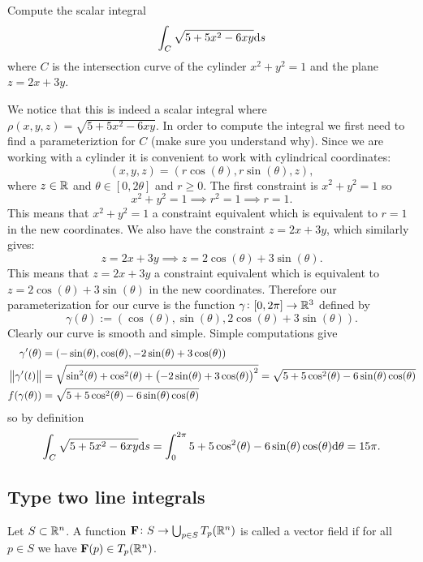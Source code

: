 \documentclass[11pt,a4paper]{article}
\begin{document}
\begin{exercise}
  Compute the scalar integral
  \[
    \int_{C} \sqrt{5 + 5x^2 - 6xy} \mathrm{d} s
  \]
  where $C$ is the intersection curve of the cylinder $x^2 + y^2 = 1$
  and the plane $z = 2x + 3y$.
\end{exercise}
\begin{solution}
  We notice that this is indeed a scalar integral where
  $\rho(x,y,z) = \sqrt{5 + 5x^2 - 6xy}$.
  In order to compute the integral we
  first need to find a parameteriztion for $C$ (make sure you understand why).
  Since we are working with a cylinder it is convenient to work with
  cylindrical coordinates:
  \[
    (x,y,z) = (r\cos(\theta),r\sin(\theta),z),
  \]
  where $z \in \mathbb{R}$ and $\theta \in [0,2\theta]$ and $r \geq 0$.
  The first constraint is $x^2 + y^2 = 1$ so
  \[
    x^2 + y^2 = 1 \implies
    r^2 = 1 \implies r = 1.
  \]
  This means that $x^2 + y^2 = 1$ a constraint equivalent
  which is equivalent to $r = 1$ in the new coordinates.
  We also have the constraint $z = 2x + 3y$, which similarly gives:
  \[
    z = 2x + 3y \implies
    z = 2\cos(\theta) + 3\sin(\theta).
  \]
  This means that $z = 2x + 3y$ a constraint equivalent
  which is equivalent to $z = 2\cos(\theta) + 3\sin(\theta)$
  in the new coordinates.
  Therefore our parameterization for our curve is
  the function $\gamma \colon [0,2\pi] \to \mathbb{R}^3$ defined by
  \[
    \gamma(\theta) := (\cos(\theta),\sin(\theta),2\cos(\theta) + 3\sin(\theta)).
  \]
  Clearly our curve is smooth and simple.
  Simple computations give
  \begin{align*}
    \gamma'(\theta) &=
      (-\sin(\theta),\cos(\theta),-2\sin(\theta) + 3\cos(\theta)) \\
    \norm{\gamma'(t)} &=
    \sqrt{\sin^2(\theta) + \cos^2(\theta) + \del{-2\sin(\theta) + 3\cos(\theta)}^2} =
    \sqrt{5 + 5\cos^2(\theta) - 6\sin(\theta)\cos(\theta)} \\
    f(\gamma(\theta)) &=
    \sqrt{5 + 5\cos^2(\theta) - 6\sin(\theta)\cos(\theta)}
  \end{align*}
  so by definition
  \[
    \int_{C} \sqrt{5 + 5x^2 - 6xy} \mathrm{d} s =
    \int_{0}^{2\pi} 5 + 5\cos^2(\theta) - 6\sin(\theta)\cos(\theta) \mathrm{d} \theta =
    15\pi.
  \]
\end{solution}

\subsection{Type two line integrals}

\begin{definition}
  Let $S \subset \mathbb{R}^n$.
  A function $\boldsymbol{\mathbf{F}} \colon S \to \bigcup_{p \in S}{T_p(\mathbb{R}^n)}$ is called a
  vector field if for all $p \in S$ we have $\boldsymbol{\mathbf{F}}(p) \in T_p(\mathbb{R}^n)$.
\end{definition}
\end{document}
